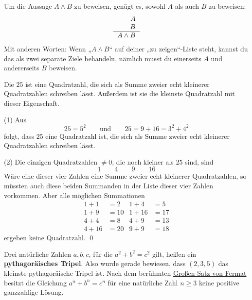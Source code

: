 \begin{axiom} \label{undbeweise}
    Um die Aussage $A\land B$ zu beweisen, genügt es, sowohl $A$ als auch $B$ zu beweisen:
    \[\begin{tabular}{r}
        $A$ \\
        $B$ \\
        \hline 
        $A\land B$
    \end{tabular} \]
    Mit anderen Worten: Wenn „$A\land B$“ auf deiner „zu zeigen“-Liste steht, kannst du das als zwei separate Ziele behandeln, nämlich musst du einerseits $A$ und andererseits $B$ beweisen.
\end{axiom}


\begin{bsp}[*]
    Die $25$ ist eine Quadratzahl, die sich als Summe zweier echt kleinerer Quadratzahlen schreiben lässt. Außerdem ist sie die kleinste Quadratzahl mit dieser Eigenschaft.
\end{bsp}


\begin{bew}
    (1) Aus
        \[ 25=5^2 \qquad\text{und}\qquad 25 = 9 + 16 = 3^2 + 4^2 \]
    folgt, dass $25$ eine Quadratzahl ist, die sich als Summe zweier echt kleinerer Quadratzahlen schreiben lässt.
    
    (2) Die einzigen Quadratzahlen $\neq 0$, die noch kleiner als $25$ sind, sind
        \[ 1\qquad 4\qquad 9\qquad 16 \]
    Wäre eine dieser vier Zahlen eine Summe zweier echt kleinerer Quadratzahlen, so müssten auch diese beiden Summanden in der Liste dieser vier Zahlen vorkommen. Aber alle möglichen Summationen
    \begin{align*}
        1+1 & = 2 & 1+4 & = 5 \\
        1+ 9 & = 10 & 1+16 & = 17 \\
        4 + 4 & = 8 & 4+9 & = 13 \\
        4+16 & = 20 & 9+9 & = 18
    \end{align*}
    ergeben keine Quadratzahl. \qed
\end{bew}


\begin{bem}[*]
    Drei natürliche Zahlen $a,b,c$, für die $a^2+b^2=c^2$ gilt, heißen ein \textbf{pythagoräisches Tripel}. Also wurde gerade bewiesen, dass $(2,3,5)$ das kleinste pythagoräische Tripel ist. Nach dem berühmten \href{https://de.wikipedia.org/wiki/Gro\%C3\%9Fer_Fermatscher_Satz}{Großen Satz von Fermat} besitzt die Gleichung $a^n+b^n=c^n$ für eine natürliche Zahl $n\ge 3$ keine positive ganzzahlige Lösung.
\end{bem}


